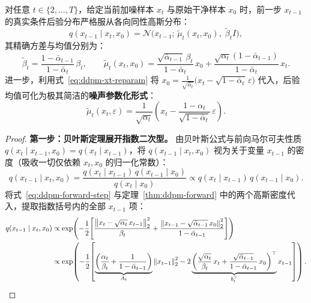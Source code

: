 \begin{thmBox}
\begin{theorem}
\label{thm:ddpm-posterior}
对任意 $t \in \{2, \dots, T\}$，给定当前加噪样本 $x_t$ 与原始干净样本 $x_0$ 时，前一步 $x_{t-1}$ 的真实条件后验分布严格服从各向同性高斯分布：
\begin{equation}
  q(x_{t-1} \mid x_t, x_0) = \mathcal{N}\!\big(x_{t-1};\, \tilde{\mu}_t(x_t, x_0),\; \tilde{\beta}_t I\big),
  \label{eq:ddpm-post-gauss}
\end{equation}
其精确方差与均值分别为：
\begin{equation}
  \tilde{\beta}_t = \frac{1 - \bar{\alpha}_{t-1}}{1 - \bar{\alpha}_t}\,\beta_t,
  \qquad
  \tilde{\mu}_t(x_t, x_0) = \frac{\sqrt{\bar{\alpha}_{t-1}}\,\beta_t}{1 - \bar{\alpha}_t}\, x_0
  + \frac{\sqrt{\alpha_t}(1 - \bar{\alpha}_{t-1})}{1 - \bar{\alpha}_t}\, x_t.
  \label{eq:ddpm-post-mean-x0}
\end{equation}
进一步，利用式~\eqref{eq:ddpm-xt-reparam} 将 $x_0 = \frac{1}{\sqrt{\bar{\alpha}_t}}\big(x_t - \sqrt{1 - \bar{\alpha}_t}\,\varepsilon\big)$ 代入，后验均值可化为极其简洁的\textbf{噪声参数化形式}：
\begin{equation}
  \tilde{\mu}_t(x_t, \varepsilon) = \frac{1}{\sqrt{\alpha_t}}\!\left(x_t - \frac{1 - \alpha_t}{\sqrt{1 - \bar{\alpha}_t}}\,\varepsilon\right).
  \label{eq:ddpm-post-mean-eps}
\end{equation}
\end{theorem}
\begin{proof}
\textbf{第一步：贝叶斯定理展开指数二次型。} 由贝叶斯公式与前向马尔可夫性质 $q(x_t \mid x_{t-1}, x_0) = q(x_t \mid x_{t-1})$，将 $q(x_{t-1} \mid x_t, x_0)$ 视为关于变量 $x_{t-1}$ 的密度（吸收一切仅依赖 $x_t, x_0$ 的归一化常数）：
\[
  q(x_{t-1} \mid x_t, x_0)
  = \frac{q(x_t \mid x_{t-1})\, q(x_{t-1} \mid x_0)}{q(x_t \mid x_0)}
  \propto q(x_t \mid x_{t-1})\, q(x_{t-1} \mid x_0).
\]
将式~\eqref{eq:ddpm-forward-step} 与定理~\ref{thm:ddpm-forward} 中的两个高斯密度代入，提取指数括号内的全部 $x_{t-1}$ 项：
\begin{align*}
  q(x_{t-1} \mid x_t, x_0)
  &\propto \exp\!\left(
    -\frac{1}{2}\!\left[
      \frac{\left\|x_t - \sqrt{\alpha_t}\, x_{t-1}\right\|_2^2}{\beta_t}
      + \frac{\left\|x_{t-1} - \sqrt{\bar{\alpha}_{t-1}}\, x_0\right\|_2^2}{1 - \bar{\alpha}_{t-1}}
    \right]
  \right) \\
  &\propto \exp\!\left(
    -\frac{1}{2}\!\left[
      \underbrace{\left(\frac{\alpha_t}{\beta_t} + \frac{1}{1 - \bar{\alpha}_{t-1}}\right)}_{A_t} \left\|x_{t-1}\right\|_2^2
      - 2 \underbrace{\left(\frac{\sqrt{\alpha_t}}{\beta_t}\, x_t + \frac{\sqrt{\bar{\alpha}_{t-1}}}{1 - \bar{\alpha}_{t-1}}\, x_0\right)^\top}_{b_t^\top} x_{t-1}
    \right]
  \right).
\end{align*}


\end{proof}
\end{thmBox}

